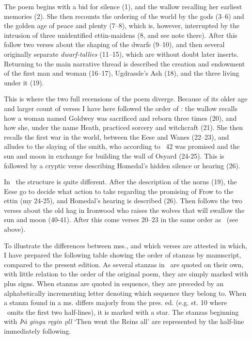 \sectionline

The poem begins with a bid for silence (1), and the wallow recalling her earliest memories (2). She then recounts the ordering of the world by the gods (3–6) and the golden age of peace and plenty (7–8), which is, however, interrupted by the intrusion of three unidentified ettin-maidens (8, and see note there). After this follow two verses about the shaping of the dwarfs (9–10), and then several originally separate \emph{dwarf-tallies} (11–15), which are without doubt later inserts. Returning to the main narrative thread is described the creation and endowment of the first man and woman (16–17), Ugdrassle’s Ash (18), and the three  living under it (19).

This is where the two full recensions of the poem diverge. Because of its older age and larger count of verses I have here followed the order of \Regius: the wallow recalls how a woman named Goldwey was sacrificed and reborn three times (20), and how she, under the name Heath, practiced sorcery and witchcraft (21). She then recalls the first war in the world, between the Eese and Wanes (22–23), and alludes to the slaying of the smith, who according to \Gylfaginning\ 42 was promised  and the sun and moon in exchange for building the wall of Osyard (24-25). This is followed by a cryptic verse describing Homedal’s hidden silence or hearing (26).

In \Hauksbok\ the structure is quite different. After the description of the norns (19), the Eese go to decide what action to take regarding the promising of Frow to the ettin (my 24-25), and Homedal’s hearing is described (26). Then follows the two verses about the old hag in Ironwood who raises the wolves that will swallow the sun and moon (40-41). After this come verses 20–23 in the same order as \Regius\ (see above).

To illustrate the differences between mss., and which verses are attested in which, I have prepared the following table showing the order of stanzas by manuscript, compared to the present edition.  As several stanzas in \GylfMS\ are quoted on their own, with little relation to the order of the original poem, they are simply marked with plus signs.  When stanzas are quoted in sequence, they are preceded by an alphabetically incrementing letter denoting which sequence they belong to.  When a stanza found in a ms. differs majorly from the pres. ed. (e.g. st. 10 where \GylfMS\ omits the first two half-lines), it is marked with a star.  The stanzas beginning with \emph{Þȧ gingu ręgin ǫll} ‘Then went the Reins all’ are represented by the half-line immediately following.

